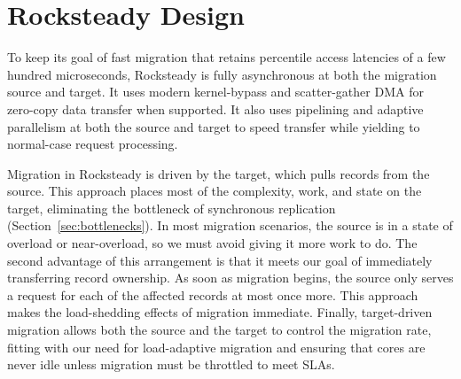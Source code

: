 
\section{Rocksteady Design}
\label{sec:new-design}


To keep its goal of fast migration that retains \nnnth percentile
access latencies of a few hundred microseconds, Rocksteady is fully
asynchronous at both the migration source and target. It uses modern kernel-bypass and
scatter-gather DMA for zero-copy data transfer when supported. It also uses
pipelining and adaptive parallelism at both the source and target to speed
transfer while yielding to normal-case request processing.

Migration in Rocksteady is driven by the target, which pulls records from
the source. This approach places most of the complexity, work, and state
on the target,
eliminating the bottleneck of synchronous replication
(Section~\ref{sec:bottlenecks}). In most migration scenarios, the source
is in a state of overload or near-overload, so we must avoid giving it
 more work to do.
The second advantage of this arrangement is that it meets
our goal of immediately transferring record ownership. As soon as
migration begins, the source only serves a request for each of
the affected records at most once more. This approach makes the
load-shedding effects
of migration immediate.
Finally, target-driven migration allows both the
source and the target to control the migration rate, fitting with our need
for load-adaptive migration and ensuring that cores are never idle unless
migration must be throttled to meet SLAs.

